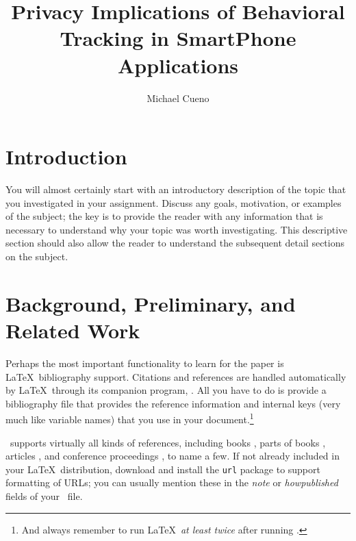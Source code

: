 \documentclass{article}
\title{Privacy Implications of Behavioral Tracking in SmartPhone Applications}
\author{Michael Cueno}
\date{}
\begin{document}
\maketitle


\pagebreak
\tableofcontents

\pagebreak
\listoffigures

\pagebreak
\listoftables

\pagebreak

%
%
\section{Introduction}
\label{introduction}

You will almost certainly start with an introductory description of the topic that you investigated in your assignment.  Discuss any goals, motivation, or examples of the subject; the key is to provide the reader with any information that is necessary to understand why your topic was worth investigating.  This descriptive section should also allow the reader to understand the subsequent detail sections on the subject.

\section{Background, Preliminary, and Related Work}

Perhaps the most important functionality to learn for the paper is \LaTeX\ bibliography support.  Citations and references are handled automatically by \LaTeX\ through its companion program, \BibTeX.  All you have to do is provide a bibliography file that provides the reference information and internal keys (very much like variable names) that you use in your document.\footnote{And always remember to run \LaTeX\ \emph{at least twice} after running \BibTeX.}

\BibTeX\ supports virtually all kinds of references, including books \cite{dui,sgg,iokit,palmos}, parts of books \cite{userModeLinux}, articles \cite{nielsen:dui-review,heer-shneiderman,stackableThreads,xpkernel}, and conference proceedings \cite{ux-3d,iring,contextFileSearch,osHaskell,hibernator}, to name a few.  If not already included in your \LaTeX\ distribution, download and install the \texttt{url} package to support formatting of URLs; you can usually mention these in the \emph{note} or \emph{howpublished} fields of your \BibTeX\ file.
\end{document}
